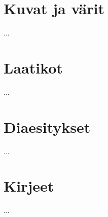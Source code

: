 \section{Kuvat ja värit}
\label{luku:grafiikka}

...

\section{Laatikot}

...

\section{Diaesitykset}
\label{luku:diaesitykset}

...

\section{Kirjeet}
\label{luku:kirjeet}

...
